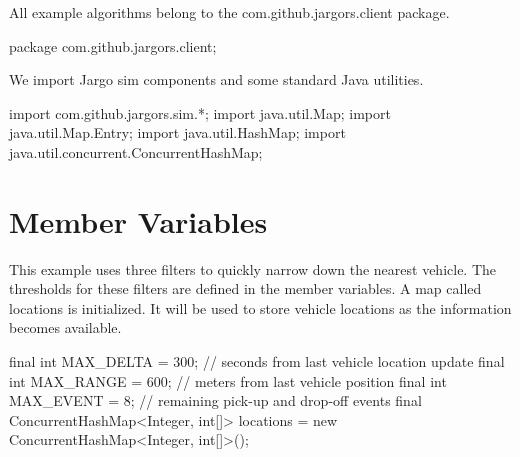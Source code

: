 All example algorithms belong to the {\Tt{}com.github.jargors.client\nwendquote} package.

\nwenddocs{}\endmoddef\nwstartdeflinemarkup{}\nwenddeflinemarkup
package com.github.jargors.client;
\nwendcode{}\nwdocspar

We import Jargo {\Tt{}sim\nwendquote} components and some standard Java utilities.

\nwenddocs{}\plusendmoddef\nwstartdeflinemarkup{}\nwenddeflinemarkup
import com.github.jargors.sim.*;
import java.util.Map;
import java.util.Map.Entry;
import java.util.HashMap;
import java.util.concurrent.ConcurrentHashMap;
\nwendcode{}\nwdocspar

\section{Member Variables}
\label{client-nearest: member-variables}

This example uses three filters to quickly narrow down the nearest vehicle.
The thresholds for these filters are defined in the member variables. A map
called {\Tt{}locations\nwendquote} is initialized. It will be used to store vehicle locations
as the information becomes available.

\nwenddocs{}\endmoddef\nwstartdeflinemarkup{}\nwenddeflinemarkup
final int MAX_DELTA = 300;  // seconds from last vehicle location update
final int MAX_RANGE = 600;  // meters from last vehicle position
final int MAX_EVENT = 8;    // remaining pick-up and drop-off events
final ConcurrentHashMap<Integer, int[]> locations =
  new ConcurrentHashMap<Integer, int[]>();
\nwendcode{}\nwdocspar

